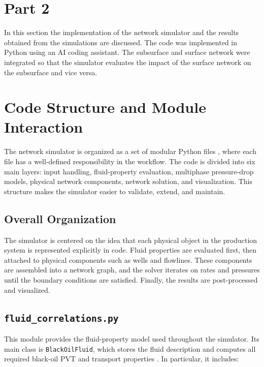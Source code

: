 \section{Part 2}
\label{sec:proc_phase2}

In this section the implementation of the network simulator and the results
obtained from the simulations are discussed. The code was implemented in Python
 using an AI coding assistant. The subsurface and surface
network were integrated so that the simulator evaluates the impact of the surface
network on the subsurface and vice versa.

\section{Code Structure and Module Interaction}

The network simulator is organized as a set of modular Python files
, where each file has a well-defined responsibility in the
workflow. The code is divided into six main layers: input handling,
fluid-property evaluation, multiphase pressure-drop models, physical network
components, network solution, and visualization. This structure makes the
simulator easier to validate, extend, and maintain.

\subsection{Overall Organization}

The simulator is centered on the idea that each physical object in the
production system is represented explicitly in code. Fluid properties are
evaluated first, then attached to physical components such as wells and
flowlines. These components are assembled into a network graph, and the solver
iterates on rates and pressures until the boundary conditions are satisfied.
Finally, the results are post-processed and visualized.

\subsection*{\texttt{fluid\_correlations.py}}

This module provides the fluid-property model used throughout the simulator.
Its main class is \texttt{BlackOilFluid}, which stores the fluid description
and computes all required black-oil PVT and transport properties
\cite{Standing1977}. In particular, it includes:

